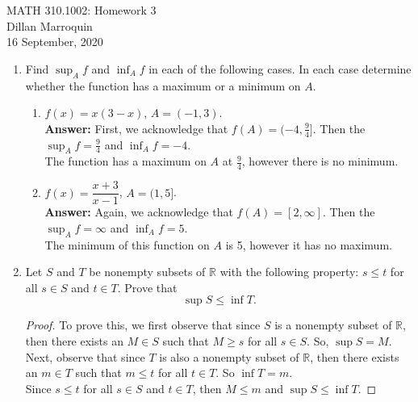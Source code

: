 \documentclass{article}
\begin{document}
    \noindent MATH 310.1002: Homework 3\\
    Dillan Marroquin\\
    16 September, 2020

    \begin{enumerate}
        \item Find $\sup_A f$ and $\inf_A f$ in each of the following cases. In each case determine whether the function has a maximum or a minimum on $A$. 
            \begin{enumerate}
                \item $f(x) = x(3-x)$, $A = (-1, 3)$.\\
                    \textbf{Answer: }First, we acknowledge that $f(A) = (-4, \tfrac{9}{4}]$. Then the $\sup_A f = \tfrac{9}{4}$ and $\inf_A f = -4$.\\
                    The function has a maximum on $A$ at $\tfrac{9}{4}$, however there is no minimum.\\
                
                \item $f(x) = \dfrac{x+3}{x-1}$, $A = (1, 5]$.\\
                    \textbf{Answer: }Again, we acknowledge that $f(A) = [2, \infty]$. Then the $\sup_A f = \infty$ and $\inf_A f = 5$.\\
                    The minimum of this function on $A$ is 5, however it has no maximum.\\
                
            \end{enumerate}
        \item Let $S$ and $T$ be nonempty subsets of $\mathbb{R}$ with the following property: $s \leq t$ for all $s \in S$ and $t \in T$. Prove that
            \[\sup S \leq \inf T.\]
            
            \begin{proof}
                To prove this, we first observe that since $S$ is a nonempty subset of $\mathbb{R}$, then there exists an $M \in S$ such that $M \geq s$ for all $s \in S$. So, $\sup S = M$. Next, observe that since $T$ is also a nonempty subset of $\mathbb{R}$, then there exists an $m \in T$ such that $m \leq t$ for all $t \in T$. So $\inf T = m$.\\
                Since $s \leq t$ for all $s \in S$ and $t \in T$, then $M \leq m$ and $\sup S \leq \inf T$.
                
            \end{proof}
            

\end{enumerate}
\end{document}
